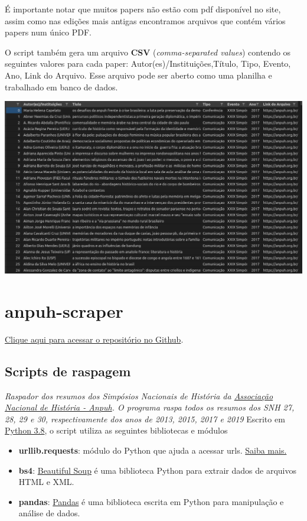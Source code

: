 \documentclass[
]{book}
\providecommand{\tightlist}{%
  \setlength{\itemsep}{0pt}\setlength{\parskip}{0pt}}
\begin{document}
É importante notar que muitos papers não estão com pdf disponível no site, assim como nas edições mais antigas encontramos arquivos que contém vários papers num único PDF.

O script também gera um arquivo \textbf{CSV} (\emph{comma-separated values}) contendo os seguintes valores para cada paper: Autor(es)/Instituições,Título, Tipo, Evento, Ano, Link do Arquivo. Esse arquivo pode ser aberto como uma planilha e trabalhado em banco de dados.

\includegraphics{img/ex_csv1.png}

\hypertarget{anpuh-scraper}{%
\section{anpuh-scraper}\label{anpuh-scraper}}

\href{https://github.com/LABHDUFBA/anpuh-scraper}{Clique aqui para acessar o repositório no Github}.

\hypertarget{scripts-de-raspagem-1}{%
\subsection{Scripts de raspagem}\label{scripts-de-raspagem-1}}

\emph{Raspador dos resumos dos Simpósios Nacionais de História da \href{https://anpuh.org.br}{Associação Nacional de História - Anpuh}. O programa raspa todos os resumos dos SNH 27, 28, 29 e 30, respectivamente dos anos de 2013, 2015, 2017 e 2019}
Escrito em \href{https://www.python.org/}{Python 3.8}, o script utiliza as seguintes bibliotecas e módulos

\begin{itemize}
\tightlist
\item
  \textbf{urllib.requests}: módulo do Python que ajuda a acessar urls.
  \href{https://docs.python.org/pt-br/3/library/urllib.request.htmll}{Saiba mais.}
\item
  \textbf{bs4}: \href{https://www.crummy.com/software/BeautifulSoup/bs4/doc/}{Beautiful Soup} é uma biblioteca Python para extrair dados de arquivos HTML e XML.
\item
  \textbf{pandas}: \href{https://pandas.pydata.org/}{Pandas} é uma biblioteca escrita em Python para manipulação e análise de dados.
\end{itemize}
\end{document}
